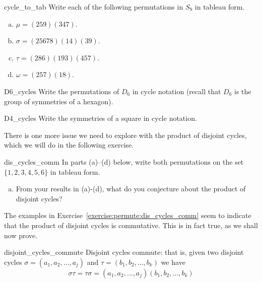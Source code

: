 \begin{exercise}{cycle_to_tab}
Write each of the following permutations in $S_9$ in tableau form.
\begin{multicols}{2}
\begin{enumerate}[(a)]
\item
$\mu = (259)(347)$.
\item
$\sigma = (25678)(14)(39)$.
\item
$\tau = (286)(193)(457)$.
\item
$\omega = (257)(18)$.
\end{enumerate}
\end{multicols}
\end{exercise}

\begin{exercise}{D6_cycles}
Write the permutations of $D_6$ in cycle notation (recall that $D_6$ is the group of symmetries of a hexagon).
\end{exercise}

\begin{exercise}{D4_cycles}
Write the symmetries of a square in cycle notation.
\end{exercise}

There is one more issue we need to explore with the product of disjoint cycles, which we will do in the following exercise.

\begin{exercise}{dis_cycles_comm}
In parts (a)--(d) below, write both permutations on the set $\{1,2,3,4,5,6\}$ in tableau form.
\begin{enumerate}[(a)]
\item
From your results in (a)-(d), what do you conjecture about the product of disjoint cycles?
\end{enumerate}
\end{exercise}
The examples in Exercise~\ref{exercise:permute:dis_cycles_comm} seem to indicate that the product of disjoint cycles is commutative. This is in fact true, as we shall now prove.
 
\begin{prop}{disjoint_cycles_commute}
Disjoint cycles commute: that is, given two disjoint cycles $\sigma = (a_1, a_2, \ldots, a_j)$ and $\tau = (b_1, b_2, \ldots, b_k)$ we have
\[
\sigma \tau = \tau \sigma = (a_1, a_2, \ldots, a_j) (b_1, b_2, \ldots, b_k) \]
\end{prop}

